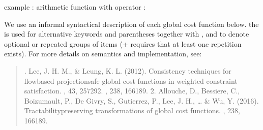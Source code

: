 \documentclass[letterpaper,10pt,openany,oneside,english]{sphinxmanual}
\begin{document}
\sphinxAtStartPar
example : arithmetic function with \sphinxcode{\sphinxupquote{\textgreater{}=}} operator :

\begin{sphinxVerbatim}[commandchars=\\\{\}]
  \PYG{p}{[} \PYG{p}{]}
            
            \PYG{p}{[} \PYG{p}{]}
\end{sphinxVerbatim}

\sphinxAtStartPar
{}

\sphinxAtStartPar
We use an informal syntactical description of each global cost function below. the  is used for alternative keywords and parentheses together with , \sphinxcode{\sphinxupquote{*}} and \sphinxcode{\sphinxupquote{+}} to denote optional or repeated groups of items (+ requires that at least one repetition exists). For more details on
semantics and implementation, see:
\begin{quote}

. Lee, J. H. M., \& Leung, K. L. (2012). Consistency techniques for flow\sphinxhyphen{}based projection\sphinxhyphen{}safe global cost functions in weighted constraint satisfaction. , 43, 257\sphinxhyphen{}292.
, 238, 166\sphinxhyphen{}189. 2. Allouche, D., Bessiere, C., Boizumault, P., De Givry, S., Gutierrez, P., Lee, J. H., … \& Wu, Y. (2016). Tractability\sphinxhyphen{}preserving transformations of global cost functions. , 238, 166\sphinxhyphen{}189.
\end{quote}
\end{document}
